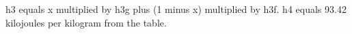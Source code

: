 h3 equals x multiplied by h3g plus (1 minus x) multiplied by h3f.  
h4 equals 93.42 kilojoules per kilogram from the table.